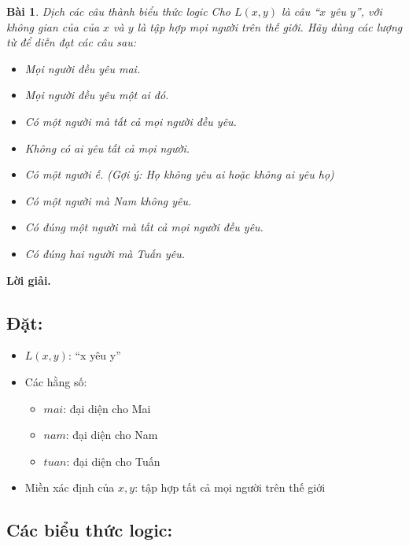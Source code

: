 \documentclass[11pt, oneside,openright,a4paper]{book}
\newtheorem{bt}{Bài }[section]
\begin{document}
\begin{bt}
Dịch các câu thành biểu thức logic
Cho $L(x,y)$ là câu ``$x$ yêu $y$'', với không gian của của $x$ và $y$ là tập hợp mọi người trên thế giới. Hãy dùng các lượng từ để diễn đạt các câu sau:
    \begin{itemize}
     \item[a)] Mọi người đều yêu mai.
        \item[b)] Mọi người đều yêu một ai đó.
        \item[c)] Có một người mà tất cả mọi người đều yêu.
        \item[d)] Không có ai yêu tất cả mọi người.
        \item[e)] Có một người ế. (Gợi ý: Họ không yêu ai hoặc không ai yêu họ)
        \item[f)] Có một người mà Nam không yêu.
        \item[g)] Có đúng một người mà tất cả mọi người đều yêu.
        \item[h)] Có đúng hai người mà Tuấn yêu.
    \end{itemize}
\end{bt}

{\bf Lời giải.} 

\subsection*{Đặt:}
\begin{itemize}
    \item $L(x, y)$: ``x yêu y''
    \item Các hằng số:
    \begin{itemize}
        \item $mai$: đại diện cho Mai
        \item $nam$: đại diện cho Nam
        \item $tuan$: đại diện cho Tuấn
    \end{itemize}
    \item Miền xác định của $x, y$: tập hợp tất cả mọi người trên thế giới
\end{itemize}

\subsection*{Các biểu thức logic:}
\end{document}
